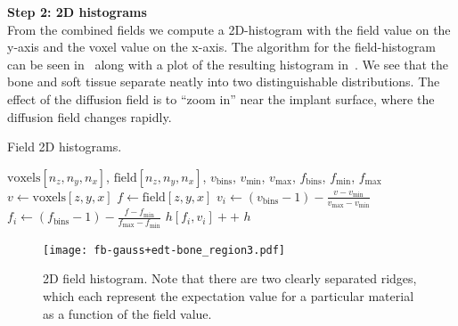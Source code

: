 \vspace{\baselineskip}
\noindent\textbf{Step 2: 2D histograms} \\
From the combined fields we compute a 2D-histogram with the field value on the y-axis and the voxel
value on the x-axis.  The algorithm for the field-histogram can be seen in~
along with a plot of the resulting histogram in~. We see that the bone and soft tissue
separate neatly into two distinguishable distributions. The effect of the diffusion field is to ``zoom in'' near the implant surface,
where the diffusion field changes rapidly.


\begin{algorithm}
    \caption{Field 2D histograms.}
    \label{alg:field-hist}
    \begin{algorithmic}
         {$\text{voxels}[n_z,n_y,n_x]$, $\text{field}[n_z,n_y,n_x]$, $v_\text{bins}$, $v_
        \text{min}$, $v_\text{max}$, $f_\text{bins}$, $f_\text{min}$, $f_\text{max}$}
                \State $v \gets \text{voxels}[z,y,x]$
                    \State $f \gets \text{field}[z,y,x]$
                        \State $v_i \gets (v_\text{bins} - 1) - \frac{v - v_\text{min}}{v_\text{max} - v_\text{min}}$
                        \State $f_i \gets (f_\text{bins} - 1) - \frac{f - f_\text{min}}{f_\text{max} - f_\text{min}}$
                        \State $h[f_i,v_i]{+}{+}$
                    \EndIf
                \EndIf
            \EndFor
            \State \Return $h$
        \EndFunction
    \end{algorithmic}
\end{algorithm}

\begin{figure}
    \texttt{[image: fb-gauss+edt-bone\_region3.pdf]}
    \caption{2D field histogram. Note that there are two clearly separated ridges, which each represent
      the expectation value for a particular material as a function of the field value.}
    \label{fig:field-hist}
\end{figure}

